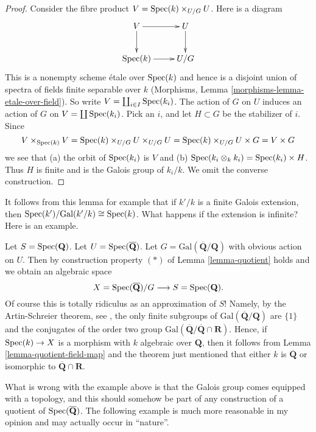 \begin{proof}
Consider the fibre product $V = \mathop{\rm Spec}(k) \times_{U/G} U$.
Here is a diagram
$$
\xymatrix{
V \ar[r] \ar[d] & U \ar[d] \\
\Spec(k) \ar[r] & U/G
}
$$
This is a nonempty scheme \'etale over $\mathop{\rm Spec}(k)$ and hence is a
disjoint union of spectra of fields finite separable over $k$
(Morphisms, Lemma \ref{morphisms-lemma-etale-over-field}). So write
$V = \coprod_{i \in I} \mathop{\rm Spec}(k_i)$.
The action of $G$ on $U$ induces an action of $G$ on
$V = \coprod \mathop{\rm Spec}(k_i)$. Pick an $i$, and let $H \subset G$ be
the stabilizer of $i$. Since
$$
V \times_{\mathop{\rm Spec}(k)} V =
\mathop{\rm Spec}(k) \times_{U/G} U \times_{U/G} U =
\mathop{\rm Spec}(k) \times_{U/G} U \times G =
V \times G
$$
we see that (a) the orbit of $\mathop{\rm Spec}(k_i)$ is $V$ and
(b) $\mathop{\rm Spec}(k_i \otimes_k k_i) = \mathop{\rm Spec}(k_i) \times H$.
Thus $H$ is finite and is the Galois group of $k_i/k$.
We omit the converse construction.
\end{proof}

\noindent
It follows from this lemma for example that
if $k'/k$ is a finite Galois extension, then
$\mathop{\rm Spec}(k')/\text{Gal}(k'/k) \cong \mathop{\rm Spec}(k)$.
What happens if the extension is infinite? Here is an example.

\begin{example}
\label{example-Qbar}
Let $S = \mathop{\rm Spec}(\mathbf{Q})$.
Let $U = \mathop{\rm Spec}(\overline{\mathbf{Q}})$.
Let $G = \text{Gal}(\overline{\mathbf{Q}}/\mathbf{Q})$ with obvious
action on $U$. Then by construction property $(*)$ of
Lemma \ref{lemma-quotient} holds and we obtain an algebraic space
$$
X = \mathop{\rm Spec}(\overline{\mathbf{Q}})/G
\longrightarrow
S = \mathop{\rm Spec}(\mathbf{Q}).
$$
Of course this is totally ridiculus as an approximation of $S$!
Namely, by the Artin-Schreier theorem,
see \cite[Theorem 17, page 316]{JacobsonIII},
the only finite subgroups of $\text{Gal}(\overline{\mathbf{Q}}/\mathbf{Q})$
are $\{1\}$ and the conjugates of the order two group
$\text{Gal}(\overline{\mathbf{Q}}/\overline{\mathbf{Q}} \cap \mathbf{R})$.
Hence, if
$\mathop{\rm Spec}(k) \to X$ is a morphism with $k$ algebraic over $\mathbf{Q}$,
then it follows from Lemma \ref{lemma-quotient-field-map} and the theorem
just mentioned that either $k$ is $\overline{\mathbf{Q}}$ or isomorphic to
$\overline{\mathbf{Q}} \cap \mathbf{R}$.
\end{example}

\noindent
What is wrong with the example above is that
the Galois group comes equipped with a topology,
and this should somehow be part of any construction
of a quotient of $\mathop{\rm Spec}(\overline{\mathbf{Q}})$.
The following example is much more reasonable in my opinion
and may actually occur in ``nature''.

